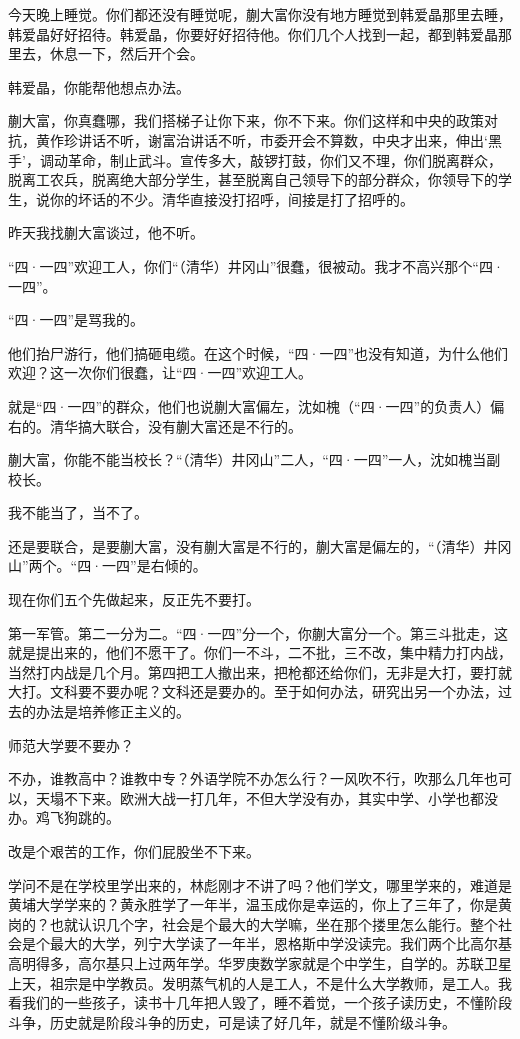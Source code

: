 今天晚上睡觉。你们都还没有睡觉呢，蒯大富你没有地方睡觉到韩爱晶那里去睡，韩爱晶好好招待。韩爱晶，你要好好招待他。你们几个人找到一起，都到韩爱晶那里去，休息一下，然后开个会。

韩爱晶，你能帮他想点办法。

蒯大富，你真蠢哪，我们搭梯子让你下来，你不下来。你们这样和中央的政策对抗，黄作珍讲话不听，谢富治讲话不听，市委开会不算数，中央才出来，伸出‘黑手’，调动革命，制止武斗。宣传多大，敲锣打鼓，你们又不理，你们脱离群众，脱离工农兵，脱离绝大部分学生，甚至脱离自己领导下的部分群众，你领导下的学生，说你的坏话的不少。清华直接没打招呼，间接是打了招呼的。

昨天我找蒯大富谈过，他不听。

“四·一四”欢迎工人，你们“（清华）井冈山”很蠢，很被动。我才不高兴那个“四·一四”。

“四·一四”是骂我的。

他们抬尸游行，他们搞砸电缆。在这个时候，“四·一四”也没有知道，为什么他们欢迎？这一次你们很蠢，让“四·一四”欢迎工人。

就是“四·一四”的群众，他们也说蒯大富偏左，沈如槐（“四·一四”的负责人）偏右的。清华搞大联合，没有蒯大富还是不行的。

蒯大富，你能不能当校长？“（清华）井冈山”二人，“四·一四”一人，沈如槐当副校长。

我不能当了，当不了。

还是要联合，是要蒯大富，没有蒯大富是不行的，蒯大富是偏左的，“（清华）井冈山”两个。“四·一四”是右倾的。

现在你们五个先做起来，反正先不要打。

第一军管。第二一分为二。“四·一四”分一个，你蒯大富分一个。第三斗批走，这就是提出来的，他们不愿干了。你们一不斗，二不批，三不改，集中精力打内战，当然打内战是几个月。第四把工人撤出来，把枪都还给你们，无非是大打，要打就大打。文科要不要办呢？文科还是要办的。至于如何办法，研究出另一个办法，过去的办法是培养修正主义的。

师范大学要不要办？

不办，谁教高中？谁教中专？外语学院不办怎么行？一风吹不行，吹那么几年也可以，天塌不下来。欧洲大战一打几年，不但大学没有办，其实中学、小学也都没办。鸡飞狗跳的。

改是个艰苦的工作，你们屁股坐不下来。

学问不是在学校里学出来的，林彪刚才不讲了吗？他们学文，哪里学来的，难道是黄埔大学学来的？黄永胜学了一年半，温玉成你是幸运的，你上了三年了，你是黄岗的？也就认识几个字，社会是个最大的大学嘛，坐在那个搂里怎么能行。整个社会是个最大的大学，列宁大学读了一年半，恩格斯中学没读完。我们两个比高尔基高明得多，高尔基只上过两年学。华罗庚数学家就是个中学生，自学的。苏联卫星上天，祖宗是中学教员。发明蒸气机的人是工人，不是什么大学教师，是工人。我看我们的一些孩子，读书十几年把人毁了，睡不着觉，一个孩子读历史，不懂阶段斗争，历史就是阶段斗争的历史，可是读了好几年，就是不懂阶级斗争。

